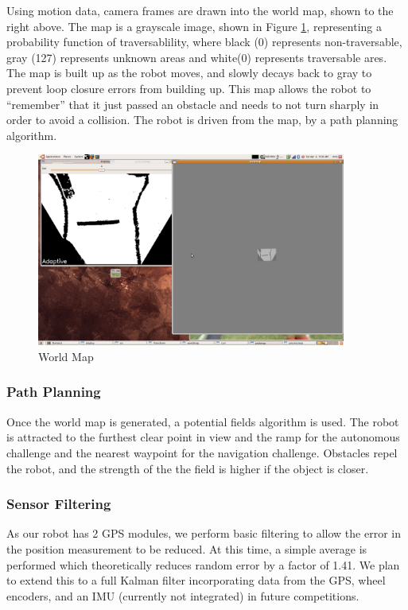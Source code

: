 Using motion data, camera frames are drawn into the world map, shown to the right above. The map is a grayscale image, shown in Figure \ref{FIG:Map}, representing a probability function of traversablility, where black (0) represents non-traversable, gray (127) represents unknown areas and white(0) represents traversable ares. The map is built up as the robot moves, and slowly decays back to gray to prevent loop closure errors from building up. This map allows the robot to ``remember'' that it just passed an obstacle and needs to not turn sharply in order to avoid a collision. The robot is driven from the map, by a path planning algorithm.

\begin{figure}[H]
\begin{center}
\includegraphics[width=4in]{./pics/map.png}
\caption{World Map}
\label{FIG:Map}
\end{center}
\end{figure}

\subsubsection{Path Planning}

Once the world map is generated, a potential fields algorithm is used. The robot is attracted to the furthest clear point in view and the ramp for the autonomous challenge and the nearest waypoint for the navigation challenge. Obstacles repel the robot, and the strength of the the field is higher if the object is closer.

\subsubsection{Sensor Filtering}

As our robot has 2 GPS modules, we perform basic filtering to allow the error in the position measurement to be reduced. At this time, a simple average is performed which theoretically reduces random error by a factor of 1.41. We plan to extend this to a full Kalman filter incorporating data from the GPS, wheel encoders, and an IMU (currently not integrated) in future competitions.

